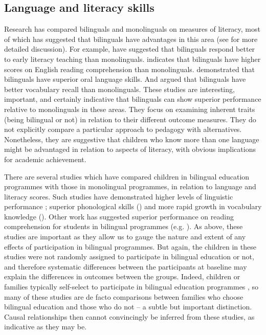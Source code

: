 \documentclass[output=paper]{langscibook}
\begin{document}
\subsection{Language and literacy skills}

Research has compared bilinguals and monolinguals on measures of literacy, most of which has suggested that bilinguals have advantages in this area (see \citealt{MurphyEtAl2020} for more detailed discussion). For example, \citet{SilvenRubinov2010} have suggested that bilinguals respond better to early literacy teaching than monolinguals. \citet{Modirkhamene2006} indicates that bilinguals have higher scores on English reading comprehension than monolinguals. \citet{KnellEtAl2007} demonstrated that bilinguals have superior oral language skills. And \citet{BialystokFeng2009} argued that bilinguals have better vocabulary recall than monolinguals. These studies are interesting, important, and certainly indicative that bilinguals can show superior performance relative to monolinguals in these areas. They focus on examining inherent traits (being bilingual or not) in relation to their different outcome measures. They do not explicitly compare a particular approach to pedagogy with alternatives. Nonetheless, they are suggestive that children who know more than one language might be advantaged in relation to aspects of literacy, with obvious implications for academic achievement. 

There are several studies which have compared children in bilingual education programmes with those in monolingual programmes, in relation to language and literacy scores. Such studies have demonstrated higher levels of linguistic performance \citep{Lazaruk2007}; superior phonological skills (\citealt{LaurentMartinot2010}) and more rapid growth in vocabulary knowledge (\citealt{LoMurphy2010}). Other work has suggested superior performance on reading comprehension for students in bilingual programmes (e.g. \citealt{DeSousa2012}). As above, these studies are important as they allow us to gauge the nature and extent of any effects of participation in bilingual programmes. But again, the children in these studies were not randomly assigned to participate in bilingual education or not, and therefore systematic differences between the participants at baseline may explain the differences in outcomes between the groups. Indeed, children or families typically self-select to participate in bilingual education programmes \citep{Murphy2014}, so many of these studies are de facto comparisons between families who choose bilingual education and those who do not -- a subtle but important distinction. Causal relationships then cannot convincingly be inferred from these studies, as indicative as they may be.
\end{document}
